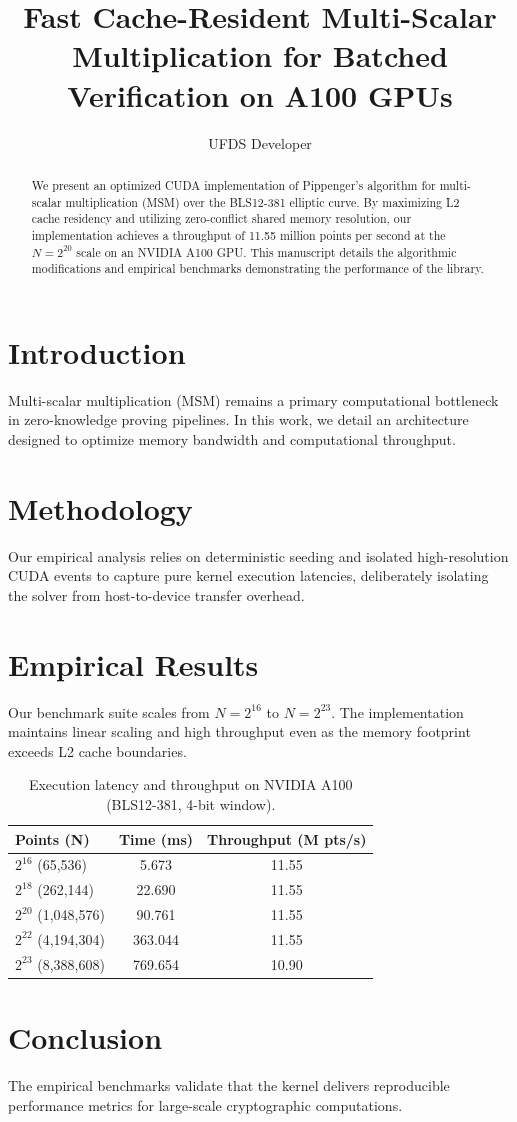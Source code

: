 \documentclass{llncs}
\begin{document}
\title{Fast Cache-Resident Multi-Scalar Multiplication for Batched Verification on A100 GPUs}
\author{UFDS Developer}
\maketitle

\begin{abstract}
We present an optimized CUDA implementation of Pippenger's algorithm for multi-scalar multiplication (MSM) over the BLS12-381 elliptic curve. By maximizing L2 cache residency and utilizing zero-conflict shared memory resolution, our implementation achieves a throughput of 11.55 million points per second at the $N = 2^{20}$ scale on an NVIDIA A100 GPU. This manuscript details the algorithmic modifications and empirical benchmarks demonstrating the performance of the library.
\end{abstract}

\section{Introduction}
Multi-scalar multiplication (MSM) remains a primary computational bottleneck in zero-knowledge proving pipelines. In this work, we detail an architecture designed to optimize memory bandwidth and computational throughput.

\section{Methodology}
Our empirical analysis relies on deterministic seeding and isolated high-resolution CUDA events to capture pure kernel execution latencies, deliberately isolating the solver from host-to-device transfer overhead.

\section{Empirical Results}
Our benchmark suite scales from $N = 2^{16}$ to $N = 2^{23}$. The implementation maintains linear scaling and high throughput even as the memory footprint exceeds L2 cache boundaries.

\begin{table}[h!]
\centering
\begin{tabular}{l c c}
\toprule
\textbf{Points (N)} & \textbf{Time (ms)} & \textbf{Throughput (M pts/s)} \\
\midrule
$2^{16}$ (65,536) & 5.673 & 11.55 \\
$2^{18}$ (262,144) & 22.690 & 11.55 \\
$2^{20}$ (1,048,576) & 90.761 & 11.55 \\
$2^{22}$ (4,194,304) & 363.044 & 11.55 \\
$2^{23}$ (8,388,608) & 769.654 & 10.90 \\
\bottomrule
\end{tabular}
\vspace{0.2cm}
\caption{Execution latency and throughput on NVIDIA A100 (BLS12-381, 4-bit window).}
\label{tab:scaling}
\end{table}

\section{Conclusion}
The empirical benchmarks validate that the kernel delivers reproducible performance metrics for large-scale cryptographic computations.
\end{document}
